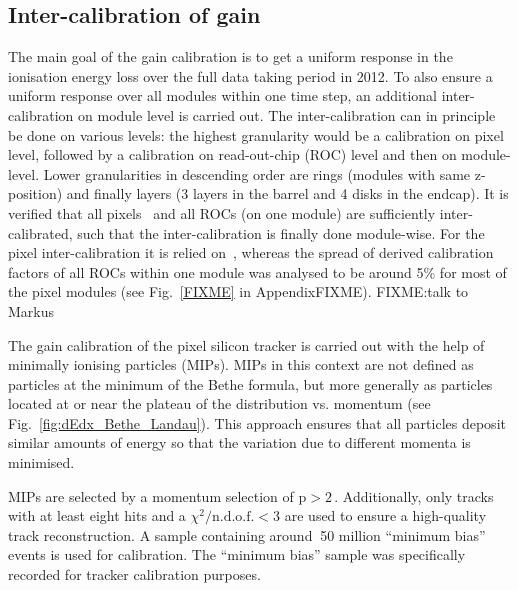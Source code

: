 \subsection*{Inter-calibration of gain}
The main goal of the gain calibration is to get a uniform response in the ionisation energy loss \dedx over the full data taking period in 2012.
To also ensure a uniform response over all modules within one time step, an additional inter-calibration on module level is carried out.
The inter-calibration can in principle be done on various levels: the highest granularity would be a calibration on pixel level, followed by a calibration on read-out-chip (ROC) level and then on module-level.
Lower granularities in descending order are rings (modules with same z-position) and finally layers (3 layers in the barrel and 4 disks in the endcap). 
It is verified that all pixels~\cite{bib:Danek} and all ROCs (on one module) are sufficiently inter-calibrated, such that the inter-calibration is finally done module-wise.
For the pixel inter-calibration it is relied on~\cite{bib:Danek}, whereas the spread of derived calibration factors of all ROCs within one module was analysed to be around 5\% for most of the pixel modules (see Fig.~\ref{FIXME} in Appendix{FIXME}). FIXME:talk to Markus


The gain calibration of the pixel silicon tracker is carried out with the help of minimally ionising particles (MIPs).
MIPs in this context are not defined as particles at the minimum of the Bethe formula, but more generally as particles located at or near the plateau of the \dedx distribution vs. momentum (see Fig.~\ref{fig:dEdx_Bethe_Landau}).
This approach ensures that all particles deposit similar amounts of energy so that the variation due to different momenta is minimised.

MIPs are selected by a momentum selection of $\text{p}>2\,$\gev.
Additionally, only tracks with at least eight hits and a $\chi^2/\text{n.d.o.f.}<3$ are used to ensure a high-quality track reconstruction.
A sample containing around $~$50 million ``minimum bias'' events is used for calibration.
The ``minimum bias'' sample was specifically recorded for tracker calibration purposes.

